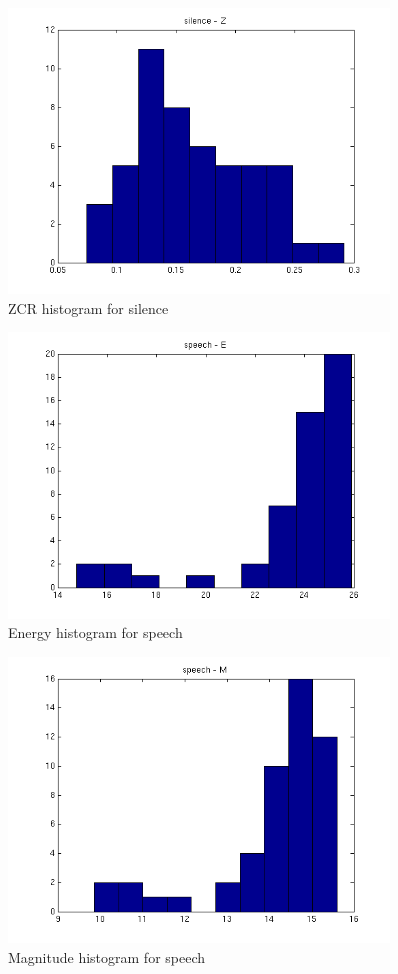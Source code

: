 \documentclass{article}
\begin{document}
\begin{figure}[h!]
  \centering
  \includegraphics[width=0.9\textwidth]{histo_sil_z}
  \caption{ZCR histogram for silence}
  \label{fig:histo_sil_z}
\end{figure} 
\begin{figure}[h!]
  \centering
  \includegraphics[width=0.9\textwidth]{histo_sp_e}
  \caption{Energy histogram for speech}
  \label{fig:histo_sp_e}
\end{figure} 
\begin{figure}[h!]
  \centering
  \includegraphics[width=0.9\textwidth]{histo_sp_m}
  \caption{Magnitude histogram for speech}
  \label{fig:histo_sp_m}
\end{figure} 
\end{document}
